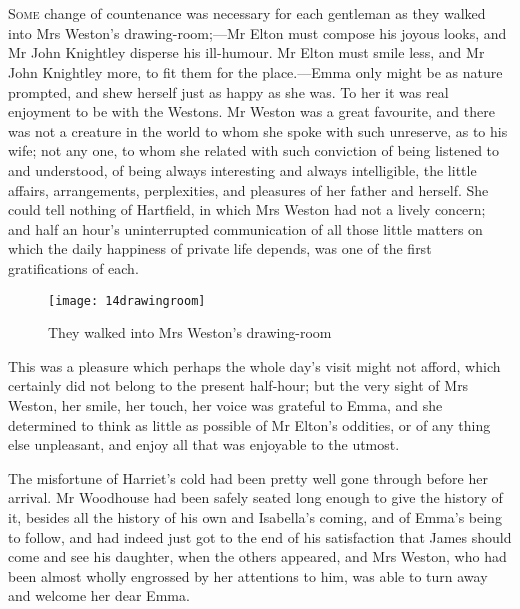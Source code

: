 \chapter[Chapter \thechapter]{}
\lettrine[lraise=0.3]{S}{ome} change of countenance was necessary for each gentleman as they walked into Mrs Weston's drawing-room;—Mr Elton must compose his joyous looks, and Mr John Knightley disperse his ill-humour. Mr Elton must smile less, and Mr John Knightley more, to fit them for the place.—Emma only might be as nature prompted, and shew herself just as happy as she was. To her it was real enjoyment to be with the Westons. Mr Weston was a great favourite, and there was not a creature in the world to whom she spoke with such unreserve, as to his wife; not any one, to whom she related with such conviction of being listened to and understood, of being always interesting and always intelligible, the little affairs, arrangements, perplexities, and pleasures of her father and herself. She could tell nothing of Hartfield, in which Mrs Weston had not a lively concern; and half an hour's uninterrupted communication of all those little matters on which the daily happiness of private life depends, was one of the first gratifications of each.

\begin{figure}[tbph]
\centering
\texttt{[image: 14drawingroom]}
\caption{They walked into Mrs Weston's drawing-room}
\end{figure}

This was a pleasure which perhaps the whole day's visit might not afford, which certainly did not belong to the present half-hour; but the very sight of Mrs Weston, her smile, her touch, her voice was grateful to Emma, and she determined to think as little as possible of Mr Elton's oddities, or of any thing else unpleasant, and enjoy all that was enjoyable to the utmost.

The misfortune of Harriet's cold had been pretty well gone through before her arrival. Mr Woodhouse had been safely seated long enough to give the history of it, besides all the history of his own and Isabella's coming, and of Emma's being to follow, and had indeed just got to the end of his satisfaction that James should come and see his daughter, when the others appeared, and Mrs Weston, who had been almost wholly engrossed by her attentions to him, was able to turn away and welcome her dear Emma.

